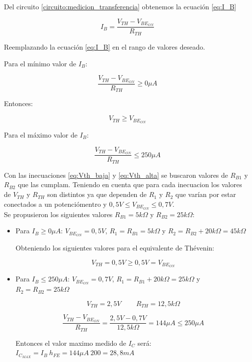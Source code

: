 \documentclass[10pt,spanish,a4paper,openany,notitlepage]{article}
\begin{document}
Del circuito \ref{circuito:medicion_transferencia} obtenemos la ecuación \ref{eq:I_B}

\begin{equation}
\displaystyle I_B = \frac{V_{TH} - V_{BE_{ON}}}{R_{TH}}
\label{eq:I_B}
\end{equation}

Reemplazando la ecuación \ref{eq:I_B} en el rango de valores deseado.

Para el mínimo valor de $I_B$:

\[ \displaystyle \frac{V_{TH} - V_{BE_{ON}}}{R_{TH}} \geq 0 \unit{\mu A} \]

Entonces:

\begin{equation}
V_{TH} \geq V_{BE_{ON}}
\label{eq:Vth_baja}
\end{equation}

Para el máximo valor de $I_B$:

\begin{equation}
\frac{V_{TH} - V_{BE_{ON}}}{R_{TH}} \leq 250 \unit{\mu A}
\label{eq:Vth_alta}
\end{equation}

Con las inecuaciones \ref{eq:Vth_baja} y \ref{eq:Vth_alta} se buscaron valores de $R_{B1}$ y $R_{B2}$ que las cumplam. Teniendo en cuenta que para cada inecuacion los valores de $V_{TH}$ y $R_{TH}$ son distintos ya que dependen de $R_1$ y $R_2$ que varían por estar conectados a un potenciómentro y $0,5 \unit{V} \leq V_{BE_{ON}} \leq 0,7 \unit{V}$.\\

Se propusieron los siguientes valores $R_{B1} = 5\unit{k\Omega}$ y $R_{B2} = 25\unit{k\Omega}$:

\begin{itemize}
\item{Para $I_B \geq 0 \unit{\mu A}$}: $V_{BE_{ON}} = 0,5 \unit{V}$, $R_1 = R_{B1} = 5 \unit{k\Omega}$ y $R_2 = R_{B2} + 20\unit{k\Omega} = 45 \unit{k\Omega}$

Obteniendo los siguientes valores para el equivalente de Thévenin:

\[ \displaystyle V_{TH} =  0,5 \unit{V} \geq 0,5 \unit{V} = V_{BE_{ON}}\]

\item{Para $I_B \leq 250 \unit{\mu A}$}: $V_{BE_{ON}} = 0,7 \unit{V}$, $R_1 = R_{B1}+ 20\unit{k\Omega} = 25 \unit{k\Omega}$ y $R_2 = R_{B2} = 25 \unit{k\Omega}$

\[ \displaystyle V_{TH} =  2,5 \unit{V} \ \ \ \ \ \ \ \ \ \  R_{TH} = 12,5 \unit{k\Omega}\]

\[ \displaystyle \frac{V_{TH} - V_{BE_{ON}}}{R_{TH}} = \frac{2,5 \unit{V} - 0,7 \unit{V}}{12,5 \unit{k\Omega}} = 144 \unit{\mu A} \leq 250 \unit{\mu A} \]

Entonces el valor maximo medido de $I_C$ será: $I_{C_{MAX}} = I_B\ h_{FE} = 144 \unit{\mu A}\ 200 = 28,8 \unit{mA}$

\end{itemize}
\end{document}
